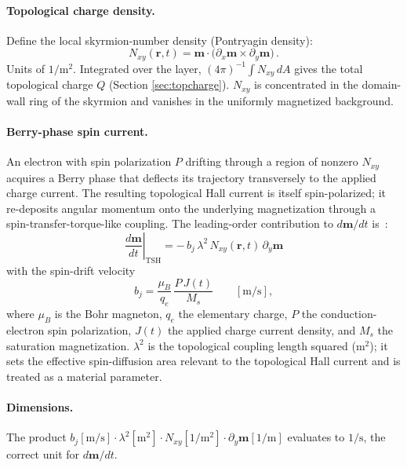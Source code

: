 \documentclass[11pt,a4paper]{article}
\newcommand{\mb}[1]{\mathbf{#1}}
\newcommand{\Ms}{M_s}
\begin{document}
\paragraph{Topological charge density.}
Define the local skyrmion-number density (Pontryagin density):
%
\begin{equation}
N_{xy}(\mb{r}, t) =
    \mb{m} \cdot
    \bigl(\partial_x \mb{m} \times \partial_y \mb{m}\bigr) \,.
\label{eq:topo_density}
\end{equation}
%
Units of $1/\text{m}^2$.  Integrated over the layer, $(4\pi)^{-1}
\int N_{xy}\, dA$ gives the total topological charge $Q$ (Section
\ref{sec:topcharge}).  $N_{xy}$ is concentrated in the domain-wall
ring of the skyrmion and vanishes in the uniformly magnetized
background.

\paragraph{Berry-phase spin current.}
An electron with spin polarization $P$ drifting through a region
of nonzero $N_{xy}$ acquires a Berry phase that deflects its
trajectory transversely to the applied charge current.  The
resulting topological Hall current is itself spin-polarized; it
re-deposits angular momentum onto the underlying magnetization
through a spin-transfer-torque-like coupling.  The leading-order
contribution to $d\mb{m}/dt$ is~\cite{yin2015}:
%
\begin{equation}
\boxed{
\left.\frac{d\mb{m}}{dt}\right|_{\text{TSH}} =
    -\,b_j\,\lambda^2\,
    N_{xy}(\mb{r}, t)\,
    \partial_y \mb{m}
}
\label{eq:tsh_torque}
\end{equation}
%
with the spin-drift velocity
%
\begin{equation}
b_j = \frac{\mu_B}{q_e}\,\frac{P\,J(t)}{\Ms}
\qquad [\text{m/s}],
\label{eq:bj_def}
\end{equation}
%
where $\mu_B$ is the Bohr magneton, $q_e$ the elementary
charge, $P$ the conduction-electron spin polarization, $J(t)$
the applied charge current density, and $\Ms$ the saturation
magnetization.  $\lambda^2$ is the topological coupling length
squared (m$^2$); it sets the effective spin-diffusion area
relevant to the topological Hall current and is treated as a
material parameter.

\paragraph{Dimensions.}
The product
$b_j[\text{m/s}] \cdot \lambda^2[\text{m}^2] \cdot N_{xy}
[1/\text{m}^2] \cdot \partial_y\mb{m}[1/\text{m}]$ evaluates to
$1/\text{s}$, the correct unit for $d\mb{m}/dt$.
\end{document}
